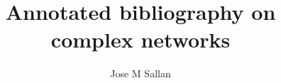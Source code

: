 \documentclass[12pt]{article}
\title{Annotated bibliography on complex networks}
\author{Jose M Sallan}
\date{}
\begin{document}
\maketitle


\nocite{*}



\end{document}
